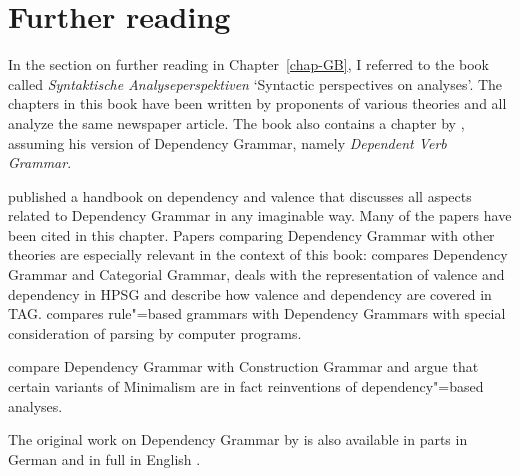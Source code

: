 \section*{Further reading}

In the section on further reading in Chapter~\ref{chap-GB}, I referred to the book called
\emph{Syntaktische Analyseperspektiven} `Syntactic perspectives on analyses'. The chapters in this book have been written by proponents of various theories
and all analyze the same newspaper article. The book also contains a chapter by \citet{Engel2014a},
assuming his version of Dependency Grammar, namely \emph{Dependent Verb Grammar}.

\citet*{AEEHHL2003a-ed,AEEHHL2006a-ed} published a handbook on dependency and valence that discusses
all aspects related to Dependency Grammar in any imaginable way. Many of the papers have been cited
in this chapter. Papers comparing Dependency Grammar with other theories are especially relevant
in the context of this book: \citet{Lobin2003a} compares Dependency Grammar and
Categorial Grammar, \citet{Oliva2003a} deals with the representation of valence and dependency in
HPSG and \citet*{BJR2003a-u} describe how valence and dependency are covered in
TAG. \citet{Hellwig2006a} compares rule"=based grammars with Dependency Grammars with special
consideration of parsing by computer programs.

\citet{OG2012a-u} compare Dependency Grammar with Construction Grammar and \citet*{OPG2011a} argue
that certain variants of Minimalism are in fact reinventions of dependency"=based analyses.

The original work on Dependency Grammar by \citet{Tesniere59a-u} is also available in parts in German
\citep{Tesniere80a-u} and in full in English \citep{Tesniere2015a-u}.













